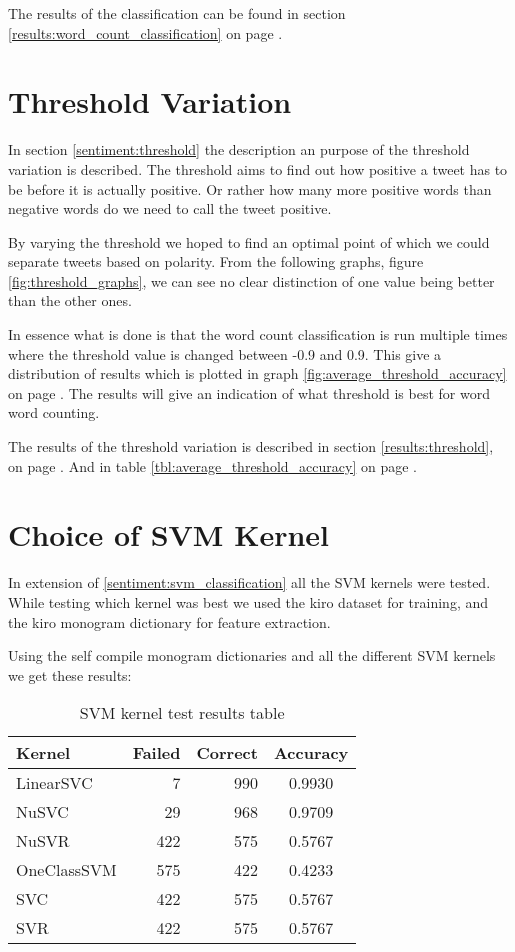 The results of the classification can be found in section
\ref{results:word_count_classification} on page
\pageref{results:word_count_classification}.
%

\section{Threshold Variation}\label{experiments:threshold}
In section \ref{sentiment:threshold} the description an purpose of the
threshold variation is described. The threshold aims to find out how positive a
tweet has to be before it is actually positive. Or rather how many more
positive words than negative words do we need to call the tweet positive. 

By varying the threshold we hoped to find an optimal point of which we could
separate tweets based on polarity. From the following
graphs, figure \ref{fig:threshold_graphs}, we can see no clear distinction of
one value being better than the other ones.

In essence what is done is that the word count classification is run multiple
times where the threshold value is changed between -0.9 and 0.9. This give a
distribution of results which is plotted in graph
\ref{fig:average_threshold_accuracy} on page
\pageref{fig:average_threshold_accuracy}.
The results will give an indication of what threshold is best for word
word counting. 

The results of the threshold variation is described in section
\ref{results:threshold}, on page \pageref{results:threshold}. And in table
\ref{tbl:average_threshold_accuracy} on page
\pageref{tbl:average_threshold_accuracy}.
%


\section{Choice of SVM Kernel}\label{experiments:svm_kernel}
In extension of \ref{sentiment:svm_classification} all the SVM kernels were tested. 
While testing which kernel was best we used the kiro dataset for training, and
the kiro monogram dictionary for feature extraction.

Using the self compile monogram dictionaries and all the different SVM kernels
we get these results:

\begin{table}
\centering
\label{tbl:svm_classifier_kernel_test}
\caption{SVM kernel test results table}
\begin{tabular}{ l r r c }
Kernel & Failed & Correct & Accuracy \\
\hline
LinearSVC & 7 & 990 & 0.9930 \\
NuSVC & 29 & 968 & 0.9709 \\
NuSVR & 422 & 575 & 0.5767 \\
OneClassSVM & 575 & 422 & 0.4233 \\
SVC & 422 & 575 & 0.5767 \\
SVR & 422 & 575 & 0.5767 \\
\end{tabular}
\end{table}
%

